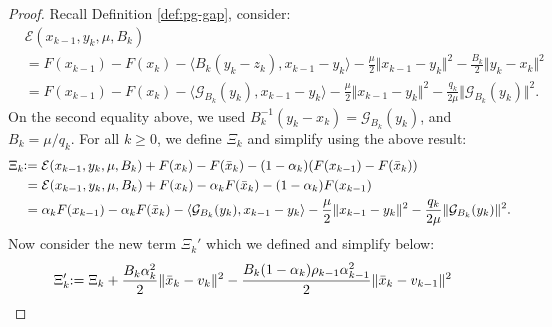 \documentclass[12pt]{article}
\begin{document}
        \begin{proof}
            Recall Definition \ref{def:pg-gap}, consider: 
            \begin{align*}
                &\mathcal E(x_{k - 1}, y_k, \mu, B_k) 
                \\
                &=
                F(x_{k - 1}) - F(x_k)
                - \langle 
                    B_k(y_k - z_k), 
                    x_{k - 1} - y_k
                \rangle
                - \frac{\mu}{2}\Vert x_{k - 1} - y_k\Vert^2
                - \frac{B_k}{2}\Vert y_k - x_k\Vert^2
                \\
                &= 
                F(x_{k - 1}) - F(x_k)
                - \langle 
                    \mathcal G_{B_k}(y_k), 
                    x_{k - 1} - y_k
                \rangle
                - \frac{\mu}{2}\Vert x_{k - 1} - y_k\Vert^2
                - \frac{q_k}{2\mu}\Vert \mathcal G_{B_k}(y_k)\Vert^2. 
            \end{align*}
            On the second equality above, we used $B^{-1}_k(y_k - x_k)= \mathcal G_{B_k}(y_k)$, and $B_k = \mu/q_k$.
            For all $k \ge 0$, we define $\Xi_k$ and simplify using the above result: 
            \begin{align*}
                \Xi_k &\hspace{-0.3em}\vcentcolon= 
                \mathcal E(x_{k - 1}, y_k, \mu, B_k)
                + F(x_k) - F(\bar x_k)
                - (1 - \alpha_k)(F(x_{k - 1}) - F(\bar x_k))
                \\
                &= 
                \mathcal E(x_{k - 1}, y_k, \mu, B_k)
                + F(x_k) - \alpha_kF(\bar x_k) - (1 - \alpha_k)F(x_{k - 1})
                \\
                &=
                \alpha_kF(x_{k - 1}) - \alpha_k F(\bar x_k)
                - \langle \mathcal G_{B_k}(y_k), x_{k - 1} - y_k\rangle
                - \frac{\mu}{2}\Vert x_{k - 1} - y_k\Vert^2 
                - \frac{q_k}{2\mu}\Vert \mathcal G_{B_k}(y_k)\Vert^2. 
            \end{align*}
            Now consider the new term $\Xi_k'$ which we defined and simplify below: 
            {\allowdisplaybreaks
            \begin{align*}
                \Xi_k'
                &\hspace{-0.3em}:=
                \Xi_k + \frac{B_k\alpha_k^2}{2}\Vert \bar x_k - v_k\Vert^2 
                - \frac{B_k(1 - \alpha_k)\rho_{k - 1}\alpha_{k - 1}^2}{2}\Vert \bar x_k - v_{k - 1}\Vert^2

\end{align*}}
\end{proof}
\end{document}
